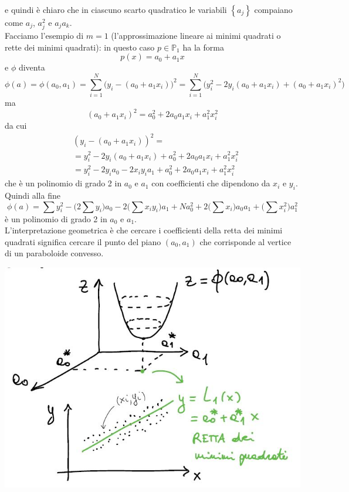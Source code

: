 \documentclass[12pt,a4paper]{article}
\begin{document}
e quindi è chiaro che in ciascuno scarto quadratico le variabili $\left\{ a_j \right\}$ compaiano come $a_j$, $a_j^2$ e $a_ja_k$. \\
Facciamo l'esempio di $m=1$ (l'approssimazione lineare ai minimi quadrati o rette dei minimi quadrati): in questo caso $p \in \mathbb{P}_1$ ha la forma 
\begin{equation*}
    p(x) = a_0 + a_1x
\end{equation*}
e $\phi$ diventa
\begin{equation*}
    \phi(a) = \phi(a_0, a_1) = \sum_{i=1}^N \biggl( y_i - (a_0+a_1x_i) \biggr) ^2 = \sum_{i=1}^N \biggl( y_i^2 - 2y_i(a_0+a_1x_i) + (a_0+a_1x_i)^2 \biggr)
\end{equation*}
ma 
\begin{equation*}
    (a_0+a_1x_i)^2 = a_0^2 + 2a_0a_1x_i + a_1^2x_i^2 
\end{equation*}
da cui
\begin{align*}
    & (y_i - (a_0+a_1x_i))^2 = \\
    & = y_i^2 - 2y_i(a_0+a_1x_i) + a_0^2 + 2a_0a_1x_i + a_1^2x_i^2 \\
    & = y_i^2 - 2y_ia_0 - 2x_iy_ia_1 + a_0^2 + 2a_0a_1x_i + a_1^2x_i^2
\end{align*}
che è un polinomio di grado 2 in $a_0$ e $a_1$ con coefficienti che dipendono da $x_i$ e $y_i$. \\
Quindi alla fine
\begin{equation*}
    \phi(a) = \sum y_i^2 - \biggl( 2\sum y_i \biggr) a_0 - 2\biggl( \sum x_iy_i \biggr)a_1 + Na_0^2 + 2\biggl( \sum x_i \biggr)a_0a_1 + \biggl( \sum x_i^2 \biggr)a_1^2
\end{equation*}
è un polinomio di grado 2 in $a_0$ e $a_1$.\\
L'interpretazione geometrica è che cercare i coefficienti della retta dei minimi quadrati significa cercare il punto del piano $(a_0,a_1)$ che corrisponde al vertice di un paraboloide convesso.
\begin{center}
    \includegraphics[scale=0.7]{calcolo12.JPG}
\end{center}
\end{document}
